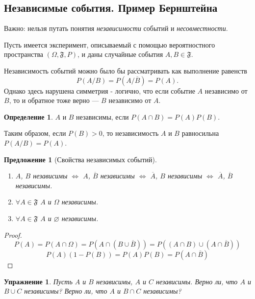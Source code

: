 \documentclass[11pt,openany,a4paper]{scrartcl}
\theoremstyle{plain}
\newtheorem{proposition}[theorem]{Предложение}
\newtheorem{exercise}[theorem]{Упражнение}
\theoremstyle{definition}
\newtheorem{definition}[theorem]{Определение}
\begin{document}
\subsection{Независимые события. Пример Бернштейна}

Важно: нельзя путать понятия \emph{независимости} событий и \emph{несовместности}.

Пусть имеется эксперимент, описываемый с помощью вероятностного пространства
$(\Omega, \mathfrak{F}, P)$, и даны случайные события $A, B \in \mathfrak{F}$.

Независимость событий можно было бы рассматривать как выполнение равенств
$$
P(A/B) = P(A/\overline{B}) = P(A).
$$
Однако здесь нарушена симметрия - логично, что если событие $A$ независимо от $B$, то
и обратное тоже верно — $B$ независимо от $A$.

\begin{definition}
    $A$ и $B$ независимы, если $P(A\cap B) = P(A)P(B)$.
\end{definition}

Таким образом, если $P(B) > 0$, то независимость $A$ и $B$ равносильна
$P(A/B) = P(A)$.
\begin{proposition}[Свойства независимых событий]
    \begin{enumerate}
        \item $A$, $B$ независимы $\iff$ $A$, $\overline{B}$ независимы
        $\iff$ $\overline{A}$, $B$ независимы $\iff$ $\overline{A}$, $\overline{B}$ 
        независимы.
        \item $\forall A \in \mathfrak{F}$ $A$ и $\Omega$ независимы.
        \item $\forall A \in \mathfrak{F}$ $A$ и $\varnothing$ независимы.
    \end{enumerate}
\end{proposition}
\begin{proof}
    $$
    P(A) = P(A\cap \Omega) = P(A \cap (B \cup \overline{B})) =
    P((A \cap B) \cup (A \cap \overline{B}))
    $$
    $$
    P(A)(1 - P(B)) = P(A)P(B) = P(A \cap \overline{B})
    $$
\end{proof}
\begin{exercise}
    Пусть $A$ и $B$ независимы, $A$ и $C$ независимы. Верно ли, что $A$ и $B \cup C$
    независимы? Верно ли, что $A$ и $B \cap C$ независимы?
\end{exercise}
\end{document}
